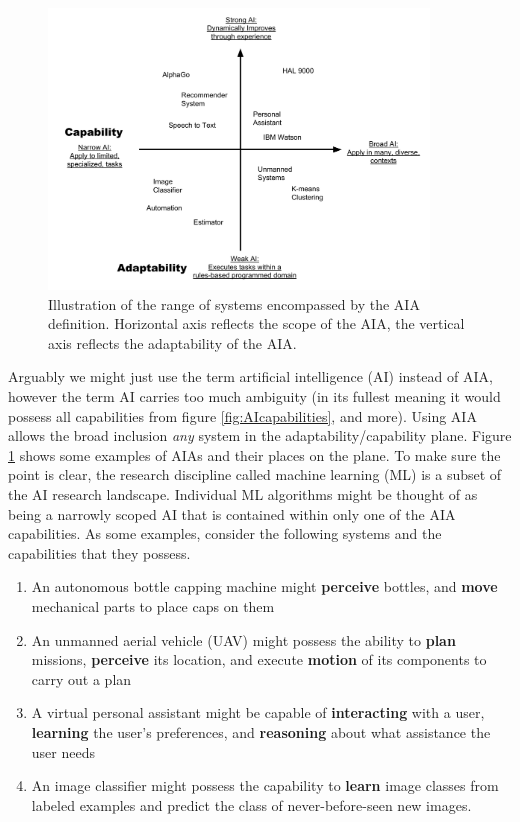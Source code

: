 	\begin{figure}[htbp]
    	\centering
     	\includegraphics[width=0.9\textwidth]{Figures/strong_weak_narrow_broad.pdf}
    	\caption{Illustration of the range of systems encompassed by the AIA definition. Horizontal axis reflects the scope of the AIA, the vertical axis reflects the adaptability of the AIA.}
        \label{fig:StrongWeak}
    \end{figure}

  Arguably we might just use the term artificial intelligence (AI) instead of AIA, however the term AI carries too much ambiguity (in its fullest meaning it would possess all capabilities from figure \ref{fig:AIcapabilities}, and more). Using AIA allows the broad inclusion \emph{any} system in the adaptability/capability plane. Figure \ref{fig:StrongWeak} shows some examples of AIAs and their places on the plane. To make sure the point is clear, the research discipline called machine learning (ML) is a subset of the AI research landscape. Individual ML algorithms might be thought of as being a narrowly scoped AI that is contained within only one of the AIA capabilities. As some examples, consider the following systems and the capabilities that they possess.

    \begin{enumerate}
         \item An autonomous bottle capping machine might \textbf{perceive} bottles, and \textbf{move} mechanical parts to place caps on them
         \item An unmanned aerial vehicle (UAV) might possess the ability to \textbf{plan} missions, \textbf{perceive} its location, and execute \textbf{motion} of its components to carry out a plan
         \item A virtual personal assistant might be capable of \textbf{interacting} with a user, \textbf{learning} the user's preferences, and \textbf{reasoning} about what assistance the user needs
         \item An image classifier might possess the capability to \textbf{learn} image classes from labeled examples and predict the class of never-before-seen new images.
     \end{enumerate}

